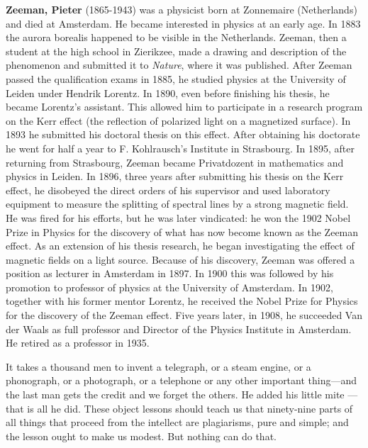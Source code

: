 {}
\label{sec:Z}

\textbf{Zeeman, Pieter} (1865-1943) was a physicist born at Zonnemaire (Netherlands) and died at Amsterdam. He became interested in physics at an early age. In 1883 the aurora borealis happened to be visible in the Netherlands. Zeeman, then a student at the high school in Zierikzee, made a drawing and description of the phenomenon and submitted it to \textit{Nature}, where it was published. After Zeeman passed the qualification exams in 1885, he studied physics at the University of Leiden under Hendrik Lorentz. In 1890, even before finishing his thesis, he became Lorentz's assistant. This allowed him to participate in a research program on the Kerr effect (the reflection of polarized light on a magnetized surface). In 1893 he submitted his doctoral thesis on this effect. After obtaining his doctorate he went for half a year to F. Kohlrausch's Institute in Strasbourg. In 1895, after returning from Strasbourg, Zeeman became Privatdozent in mathematics and physics in Leiden. In 1896, three years after submitting his thesis on the Kerr effect, he disobeyed the direct orders of his supervisor and used laboratory equipment to measure the splitting of spectral lines by a strong magnetic field. He was fired for his efforts, but he was later vindicated: he won the 1902 Nobel Prize in Physics for the discovery of what has now become known as the Zeeman effect. As an extension of his thesis research, he began investigating the effect of magnetic fields on a light source. Because of his discovery, Zeeman was offered a position as lecturer in Amsterdam in 1897. In 1900 this was followed by his promotion to professor of physics at the University of Amsterdam. In 1902, together with his former mentor Lorentz, he received the Nobel Prize for Physics for the discovery of the Zeeman effect. Five years later, in 1908, he succeeded Van der Waals as full professor and Director of the Physics Institute in Amsterdam. He retired as a professor in 1935.

	\begin{fquote}It takes a thousand men to invent a telegraph, or a steam engine, or a phonograph, or a photograph, or a telephone or any other important thing—and the last man gets the credit and we forget the others. He added his little mite — that is all he did. These object lessons should teach us that ninety-nine parts of all things that proceed from the intellect are plagiarisms, pure and simple; and the lesson ought to make us modest. But nothing can do that.
 	\end{fquote}
 	
 	